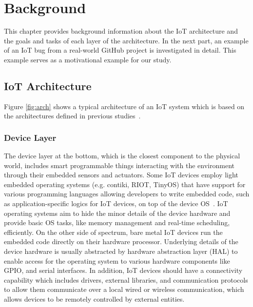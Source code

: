 
\chapter{Background}
\label{ch:background}
This chapter provides background information about the IoT architecture and the goals and tasks of each layer of the architecture. In the next part, an example of an IoT bug from a real-world GitHub project is investigated in detail. This example serves as a motivational example for our study. 

\section{IoT Architecture}
Figure \autoref{fig:arch} shows a typical architecture of an IoT system which is based on the architectures defined in previous studies~\citep{towardsIoTDefinition,stojkoska2017review,vcolakovic2018IoT,eclipse2016three}. 

\subsection{Device Layer}
The device layer at the bottom, which is the closest component to the physical world, includes smart programmable things interacting with the environment through their embedded sensors and actuators. Some IoT devices employ light embedded operating systems (e.g. contiki, RIOT, TinyOS) that have support for various programming languages allowing developers to write embedded code, such as application-specific logics for IoT devices, on top of the device OS~\cite{javed2018OS}. IoT operating systems aim to hide the minor details of the device hardware and provide basic OS tasks, like memory management and real-time scheduling, efficiently\cite{javed2018OS}. On the other side of spectrum, bare metal IoT devices run the embedded code directly on their hardware processor. Underlying details of the device hardware is usually abstracted by hardware abstraction layer (HAL) to enable access for the operating system to various hardware components like GPIO, and serial interfaces\cite{eclipse2016three}. In addition, IoT devices should have a connectivity capability which includes drivers, external libraries, and communication protocols to allow them communicate over a local wired or wireless communication, which allows devices to be remotely controlled by external entities.


